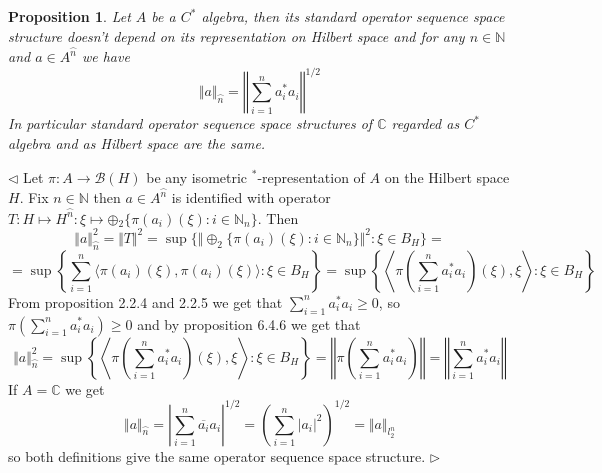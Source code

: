 \documentclass[12pt]{article}
\newtheorem{proposition}[theorem]{Proposition}
\newenvironment{proof}{\par $\triangleleft$}{$\triangleright$}
\begin{document}
\begin{proposition}\label{PrCstarAlgSQ} Let $A$ be a $C^*$ algebra, then its standard operator sequence space structure doesn't depend on its representation on Hilbert space and for any $n\in\mathbb{N}$ and $a\in A^{\wideparen{n}}$ we have
$$
\Vert a\Vert_{\wideparen{n}}=\left\Vert\sum\limits_{i=1}^n a_i^*a_i\right\Vert^{1/2}
$$
In particular standard operator sequence space structures of $\mathbb{C}$ regarded as $C^*$ algebra and as Hilbert space are the same.
\end{proposition}
\begin{proof} Let $\pi:A\to\mathcal{B}(H)$ be any isometric ${}^*$-representation of $A$ on the Hilbert space $H$. Fix $n\in\mathbb{N}$ then $a\in A^{\wideparen{n}}$ is identified with operator $T:H\mapsto H^{\wideparen{n}}:\xi\mapsto \oplus{}_2\{\pi(a_i)(\xi):i\in\mathbb{N}_n\}$. Then 
$$
\Vert a\Vert_{\wideparen{n}}^2
=\Vert T\Vert^2
=\sup\{\Vert \oplus_2\{\pi(a_i)(\xi):i\in\mathbb{N}_n\}\Vert^2:\xi\in B_H\}=
$$
$$
=\sup\left\{ \sum\limits_{i=1}^n\langle \pi(a_i)(\xi),\pi(a_i)(\xi)\rangle:\xi\in B_H\right\}
=\sup\left\{ \left\langle \pi\left(\sum\limits_{i=1}^n a_i^*a_i\right)(\xi),\xi\right\rangle:\xi\in B_H\right\}
$$
From proposition 2.2.4 and 2.2.5 \cite{MurphCstarOpTh} we get that $\sum_{i=1}^n a_i^* a_i\geq 0$, so $\pi(\sum_{i=1}^n a_i^* a_i)\geq 0$ and by proposition 6.4.6 \cite{HelFA} we get that
$$
\Vert a\Vert_{\wideparen{n}}^2
=\sup\left\{ \left\langle \pi\left(\sum\limits_{i=1}^n a_i^*a_i\right)(\xi),\xi\right\rangle:\xi\in B_H\right\}
=\left\Vert \pi\left(\sum\limits_{i=1}^n a_i^*a_i\right)\right\Vert
=\left\Vert \sum\limits_{i=1}^n a_i^*a_i\right\Vert
$$
If $A=\mathbb{C}$ we get
$$
\Vert a\Vert_{\wideparen{n}}
=\left| \sum\limits_{i=1}^n \overline{a_i}a_i\right|^{1/2}
=\left(\sum\limits_{i=1}^n |a_i|^2\right)^{1/2}
=\Vert a\Vert_{l_2^n}
$$
so both definitions give the same operator sequence space structure.
\end{proof}
\end{document}
